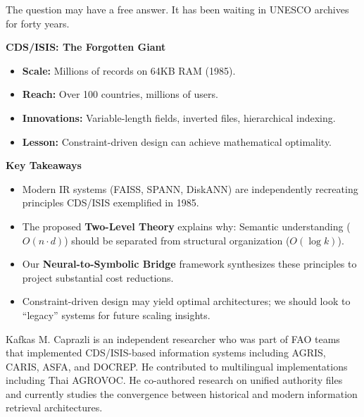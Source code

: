 \documentclass[manuscript,screen,nonacm]{acmart}
\newenvironment{sidebarbox}[1][]{%
  \def\sidebarboxtitle{#1}%
  \begin{oframed}%
  \noindent\textbf{\sidebarboxtitle}\par\smallskip
}{%
  \end{oframed}%
}
\begin{document}
The question may have a free answer. It has been waiting in UNESCO archives for forty years.

\begin{sidebarbox}[CDS/ISIS: The Forgotten Giant]
\begin{itemize}
    \item \textbf{Scale:} Millions of records on 64KB RAM (1985).
    \item \textbf{Reach:} Over 100 countries, millions of users.
    \item \textbf{Innovations:} Variable-length fields, inverted files, hierarchical indexing.
    \item \textbf{Lesson:} Constraint-driven design can achieve mathematical optimality.
\end{itemize}
\end{sidebarbox}

\begin{sidebarbox}[Key Takeaways]
\begin{itemize}
    \item Modern IR systems (FAISS, SPANN, DiskANN) are independently recreating principles CDS/ISIS exemplified in 1985.
    \item The proposed \textbf{Two-Level Theory} explains why: Semantic understanding ($O(n \cdot d)$) should be separated from structural organization ($O(\log k)$).
    \item Our \textbf{Neural-to-Symbolic Bridge} framework synthesizes these principles to project substantial cost reductions.
    \item Constraint-driven design may yield optimal architectures; we should look to ``legacy'' systems for future scaling insights.
\end{itemize}
\end{sidebarbox}




\begin{acks}
Kafkas M. Caprazli is an independent researcher who was part of FAO teams that implemented CDS/ISIS-based information systems including AGRIS, CARIS, ASFA, and DOCREP. He contributed to multilingual implementations including Thai AGROVOC. He co-authored research on unified authority files \cite{caprazli2003} and currently studies the convergence between historical and modern information retrieval architectures.
\end{acks}
\end{document}
